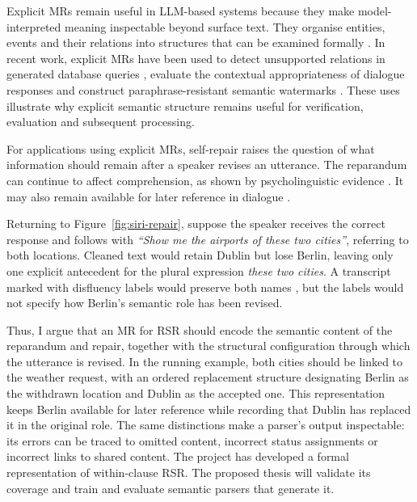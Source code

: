 Explicit MRs remain useful in LLM-based systems because they make
model-interpreted meaning inspectable beyond surface text. They organise
entities, events and their relations into structures that can be examined
formally \citep{bosSequenceNotationCatching2023}. In recent work, explicit MRs
have been used to detect unsupported relations in generated database queries
\citep{reganMASSIVEMultilingualAbstract2024}, evaluate the contextual
appropriateness of dialogue responses
\citep{yangEmphasisingStructuredInformation2025} and construct
paraphrase-resistant semantic watermarks
\citep{yeSWANSemanticWatermarking2026}. These uses illustrate why explicit
semantic structure remains useful for verification, evaluation and subsequent
processing.

For applications using explicit MRs, self-repair raises the question of what
information should remain after a speaker revises an utterance.
The reparandum can continue to affect comprehension, as shown by
psycholinguistic evidence \citep{lauLingeringEffectsDisfluent2005}. It may also
remain available for later reference in dialogue
\citep{purverComputationalModelsMiscommunication2018}.

Returning to Figure~\ref{fig:siri-repair}, suppose the speaker receives the
correct response and follows with \textit{``Show me the airports of these two
cities''}, referring to both locations. Cleaned text would retain Dublin but
lose Berlin, leaving only one explicit antecedent for the plural expression
\textit{these two cities}. A transcript marked with disfluency labels would
preserve both names \citep{futamiStreamingJointSpeech2023}, but the labels would
not specify how Berlin's semantic role has been revised.

Thus, I argue that an MR for RSR should encode the semantic content of the
reparandum and repair, together with the structural configuration through which the
utterance is revised. In the running example, both cities should be linked to the weather
request, with an ordered replacement structure designating Berlin as the
withdrawn location and Dublin as the accepted one. This representation keeps
Berlin available for later reference while recording that Dublin has replaced
it in the original role. The same distinctions make a parser's output
inspectable: its errors can be traced to omitted content, incorrect status
assignments or incorrect links to shared content. The project has developed a
formal representation of within-clause RSR. The proposed thesis will validate
its coverage and train and evaluate semantic parsers that generate it.

